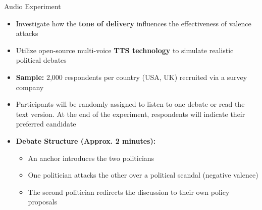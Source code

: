 \documentclass[9pt, aspectratio=169]{beamer}
\newcommand{\customcites}[1]{\textcolor{blue}{\footnotesize\parencites{#1}}}
\begin{document}

 



\begin{frame}{Audio Experiment}
\begin{itemize}

\item Investigate how the \textbf{tone of delivery} influences the effectiveness of valence attacks \customcites{Tigue2012, Gerstle2019, Kulz2023} \vspace{0.3cm}

\item Utilize open-source multi-voice \textbf{TTS technology} to simulate realistic political debates \vspace{0.3cm}

\item \textbf{Sample:} 2,000 respondents per country (USA, UK) recruited via a survey
company \vspace{0.3cm}

\item Participants will be randomly assigned to listen to one debate or read the text version. At the end of the experiment, respondents will indicate their preferred candidate \vspace{0.3cm}
\item \textbf{Debate Structure (Approx. 2 minutes):} \vspace{0.2cm}
\begin{itemize}
\item An anchor introduces the two politicians \vspace{0.2cm}
\item One politician attacks the other over a political scandal (negative valence) \vspace{0.2cm}
\item The second politician redirects the discussion to their own policy proposals \vspace{0.2cm}
\end{itemize}

\end{itemize}
\end{frame}
\end{document}

